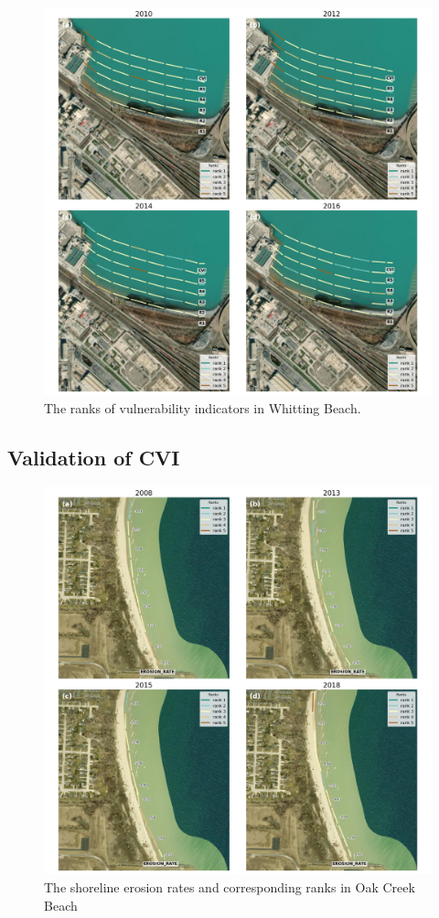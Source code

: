 \begin{figure}[htbp]
  \centering
  \includegraphics[width=1\textwidth]{chapter5/resources/site2_cvi.png}
  \caption{The ranks of vulnerability indicators in Whitting Beach.}
  \label{fig:s2_cv1}
\end{figure}

\subsection{Validation of CVI}
\label{Validation of CVI}

\begin{figure}[htbp]
  \centering
  \includegraphics[width=1\textwidth]{chapter5/resources/site1_erosion.png}
  \caption{The shoreline erosion rates and corresponding ranks in Oak Creek Beach}
  \label{fig:s1_erosion}
\end{figure}


